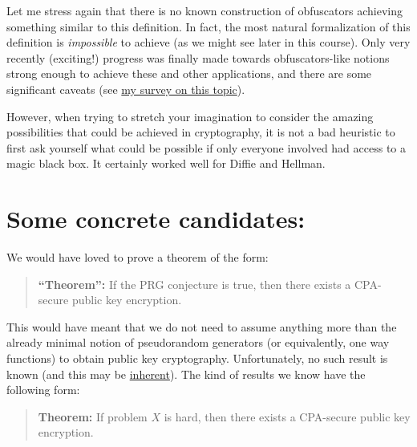 Let me stress again that there is no known construction of obfuscators
achieving something similar to this definition. In fact, the most
natural formalization of this definition is \emph{impossible} to achieve
(as we might see later in this course). Only very recently (exciting!)
progress was finally made towards obfuscators-like notions strong enough
to achieve these and other applications, and there are some significant
caveats (see \href{https://eprint.iacr.org/2016/210}{my survey on this
topic}).

However, when trying to stretch your imagination to consider the amazing
possibilities that could be achieved in cryptography, it is not a bad
heuristic to first ask yourself what could be possible if only everyone
involved had access to a magic black box. It certainly worked well for
Diffie and Hellman.

\section{Some concrete candidates:}\label{Some-concrete-candidates}

We would have loved to prove a theorem of the form:

\begin{quote}
\textbf{``Theorem'':} If the PRG conjecture is true, then there exists a
CPA-secure public key encryption.
\end{quote}

This would have meant that we do not need to assume anything more than
the already minimal notion of pseudorandom generators (or equivalently,
one way functions) to obtain public key cryptography. Unfortunately, no
such result is known (and this may be
\href{https://www.cs.virginia.edu/~mohammad/files/papers/MerkleFull.pdf}{inherent}).
The kind of results we know have the following form:

\begin{quote}
\textbf{Theorem:} If problem \(X\) is hard, then there exists a
CPA-secure public key encryption.
\end{quote}

